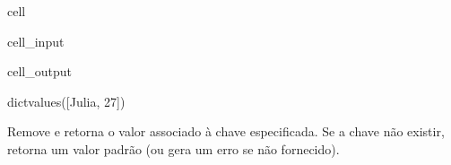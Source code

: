 \documentclass[letterpaper,10pt,english]{jupyterBook}
\begin{document}
\begin{sphinxuseclass}{cell}\begin{sphinxVerbatimInput}

\begin{sphinxuseclass}{cell_input}
\begin{sphinxVerbatim}[commandchars=\\\{\}]
     
  
\end{sphinxVerbatim}

\end{sphinxuseclass}\end{sphinxVerbatimInput}
\begin{sphinxVerbatimOutput}

\begin{sphinxuseclass}{cell_output}
\begin{sphinxVerbatim}[commandchars=\\\{\}]
dict\PYGZus{}values([\PYGZsq{}Julia\PYGZsq{}, 27])
\end{sphinxVerbatim}

\begin{sphinxVerbatim}[commandchars=\\\{\}]

\end{sphinxVerbatim}

\end{sphinxuseclass}\end{sphinxVerbatimOutput}

\end{sphinxuseclass}
\sphinxAtStartPar
{}
Remove e retorna o valor associado à chave especificada. Se a chave não existir, retorna um valor padrão (ou gera um erro se não fornecido).
\end{document}
